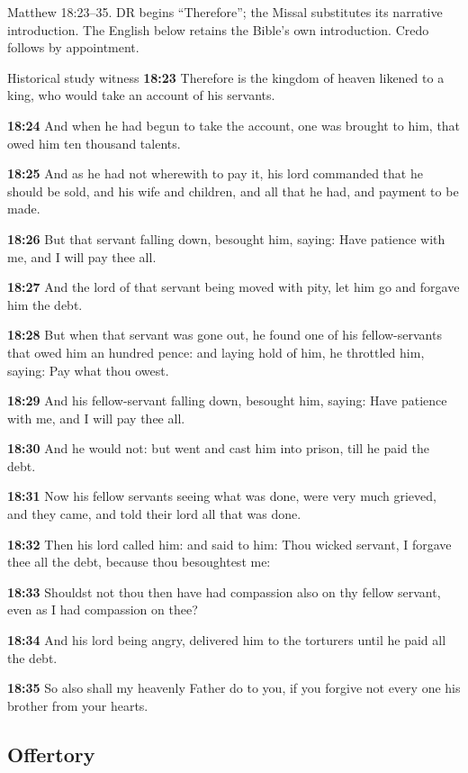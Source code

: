 Matthew 18:23–35. DR begins “Therefore”; the Missal substitutes its narrative introduction. The English below retains the Bible's own introduction. Credo follows by appointment.

\begin{englishwitness}{Historical study witness}
\textbf{18:23} Therefore is the kingdom of heaven likened to a king, who would take an account of his servants.

\textbf{18:24} And when he had begun to take the account, one was brought to him, that owed him ten thousand talents.

\textbf{18:25} And as he had not wherewith to pay it, his lord commanded that he should be sold, and his wife and children, and all that he had, and payment to be made.

\textbf{18:26} But that servant falling down, besought him, saying: Have patience with me, and I will pay thee all.

\textbf{18:27} And the lord of that servant being moved with pity, let him go and forgave him the debt.

\textbf{18:28} But when that servant was gone out, he found one of his fellow-servants that owed him an hundred pence: and laying hold of him, he throttled him, saying: Pay what thou owest.

\textbf{18:29} And his fellow-servant falling down, besought him, saying: Have patience with me, and I will pay thee all.

\textbf{18:30} And he would not: but went and cast him into prison, till he paid the debt.

\textbf{18:31} Now his fellow servants seeing what was done, were very much grieved, and they came, and told their lord all that was done.

\textbf{18:32} Then his lord called him: and said to him: Thou wicked servant, I forgave thee all the debt, because thou besoughtest me:

\textbf{18:33} Shouldst not thou then have had compassion also on thy fellow servant, even as I had compassion on thee?

\textbf{18:34} And his lord being angry, delivered him to the torturers until he paid all the debt.

\textbf{18:35} So also shall my heavenly Father do to you, if you forgive not every one his brother from your hearts.
\end{englishwitness}

\subsection{Offertory}
\label{proper-offertory}

